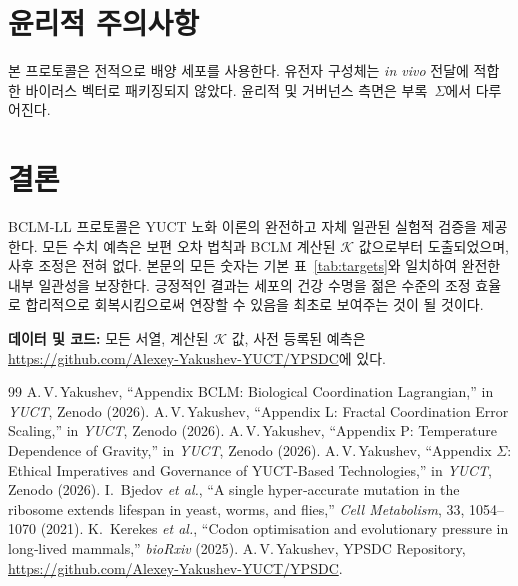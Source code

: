 \documentclass[12pt,a4paper]{article}
\newcommand{\REL}{\mathcal{K}}          %
\begin{document}
	\section{윤리적 주의사항}
	\label{sec:ethics}
	본 프로토콜은 전적으로 배양 세포를 사용한다. 유전자 구성체는 \textit{in vivo} 전달에 적합한 바이러스 벡터로 패키징되지 않았다. 윤리적 및 거버넌스 측면은 부록~\(\Sigma\)에서 다루어진다.
	
	\section{결론}
	BCLM‑LL 프로토콜은 YUCT 노화 이론의 완전하고 자체 일관된 실험적 검증을 제공한다. 모든 수치 예측은 보편 오차 법칙과 BCLM 계산된 \(\REL\) 값으로부터 도출되었으며, 사후 조정은 전혀 없다. 본문의 모든 숫자는 기본 표~\ref{tab:targets}와 일치하여 완전한 내부 일관성을 보장한다. 긍정적인 결과는 세포의 건강 수명을 젊은 수준의 조정 효율로 합리적으로 회복시킴으로써 연장할 수 있음을 최초로 보여주는 것이 될 것이다.
	
	\vspace{0.5cm}
	\noindent\textbf{데이터 및 코드:} 모든 서열, 계산된 \(\REL\) 값, 사전 등록된 예측은 \url{https://github.com/Alexey-Yakushev-YUCT/YPSDC}에 있다.
	
	\begin{thebibliography}{99}
		 A.\,V.\,Yakushev, ``Appendix BCLM: Biological Coordination Lagrangian,'' in \emph{YUCT}, Zenodo (2026).
		 A.\,V.\,Yakushev, ``Appendix L: Fractal Coordination Error Scaling,'' in \emph{YUCT}, Zenodo (2026).
		 A.\,V.\,Yakushev, ``Appendix P: Temperature Dependence of Gravity,'' in \emph{YUCT}, Zenodo (2026).
		 A.\,V.\,Yakushev, ``Appendix \(\Sigma\): Ethical Imperatives and Governance of YUCT‑Based Technologies,'' in \emph{YUCT}, Zenodo (2026).
		 I.~Bjedov \emph{et al.}, ``A single hyper‑accurate mutation in the ribosome extends lifespan in yeast, worms, and flies,'' \emph{Cell Metabolism}, 33, 1054–1070 (2021).
		 K.~Kerekes \emph{et al.}, ``Codon optimisation and evolutionary pressure in long‑lived mammals,'' \emph{bioRxiv} (2025).
		 A.\,V.\,Yakushev, YPSDC Repository, \url{https://github.com/Alexey-Yakushev-YUCT/YPSDC}.
	\end{thebibliography}
	
\end{document}
